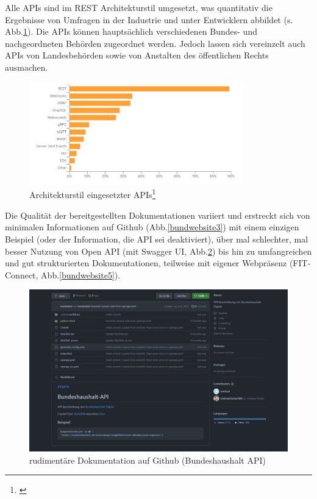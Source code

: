 \documentclass[notitlepage, hidelinks]{article}
\begin{document}
Alle APIs sind im REST Architekturstil umgesetzt, was quantitativ die Ergebnisse von Umfragen in der Industrie und  unter Entwicklern abbildet (s. Abb.\ref{stateofapitechs}). Die APIs können hauptsächlich verschiedenen Bundes- und nachgeordneten Behörden zugeordnet werden. Jedoch lassen sich vereinzelt auch APIs von Landesbehörden sowie von Anstalten des öffentlichen Rechts ausmachen.


\begin{figure}[H]
\centering
  \includegraphics[width=350px]{images/stateofapitechs.png}
\caption{Architekturstil eingesetzter APIs\protect\footnote{\cite{api-postman}}}
  \label{stateofapitechs}
\end{figure}


Die Qualität der bereitgestellten Dokumentationen variiert und erstreckt sich von minimalen Informationen auf Github (Abb.\ref{bundwebsite3}) mit einem einzigen Beispiel (oder der Information, die API sei deaktiviert), über mal schlechter, mal besser Nutzung von Open API (mit Swagger UI, Abb.\ref{bundwebsite4}) bis hin zu umfangreichen und gut strukturierten Dokumentationen, teilweise mit eigener Webpräsenz (FIT-Connect, Abb.\ref{bundwebsite5}).

\begin{figure}[H]
\centering
  \includegraphics[width=\textwidth]{images/bundwebsite4.png}
  \caption{rudimentäre Dokumentation auf Github (Bundeshaushalt API)}
  \label{bundwebsite4}
\end{figure}
\end{document}
